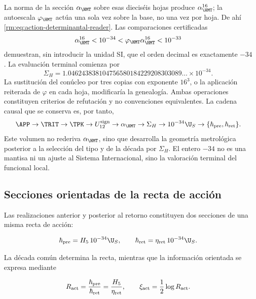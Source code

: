 La norma de la secci\'on \(\alpha_{\HMT}\) sobre esas diecis\'eis hojas
produce \(\alpha_{\HMT}^{16}\); la autoescala \(\varphi_{\HMT}\) act\'ua
una sola vez sobre la base, no una vez por hoja. De ah\'i
\cref{rm:eq:action-determinantal-reader}. Las comparaciones certificadas
\begin{equation}
\alpha_{\HMT}^{16}<10^{-34}
<\varphi_{\HMT}\alpha_{\HMT}^{16}<10^{-33}
\label{rm:eq:action-decade-bounds}
\end{equation}
demuestran, sin introducir la unidad SI, que el orden decimal es
exactamente \(-34\). La evaluaci\'on terminal comienza por
\begin{equation}
\Sigma_H
=1.046243838104756580184229208303089\ldots\times10^{-34}.
\label{rm:eq:action-sigma-value}
\end{equation}
La sustituci\'on del con\'ucleo por tres copias con exponente \(16^3\), o la
aplicaci\'on reiterada de \(\varphi\) en cada hoja, modificar\'ia la
genealog\'ia. Ambas operaciones constituyen criterios de refutaci\'on y no
convenciones equivalentes.
La cadena causal que se conserva es, por tanto,
\[
\APP\to\TRIT\to\TPK\to U_{12}^{\rm sign}
\to\alpha_{\HMT}\to\Sigma_H
\to10^{-34}\U_S\to
\{\hbar_{\rm pre},\hbar_{\rm ret}\}.
\]
Este volumen no rederiva \(\alpha_{\HMT}\), sino que desarrolla la geometr\'ia
metrol\'ogica posterior a la selecci\'on del tipo y de la d\'ecada por
\(\Sigma_H\). El entero \(-34\) no es una mantisa ni un ajuste al Sistema
Internacional, sino la valoraci\'on terminal del funcional local.

\subsection{Secciones orientadas de la recta de acci\'on}

Las realizaciones anterior y posterior al retorno constituyen dos secciones
de una misma recta de acci\'on:

\begin{equation}
\hbar_{\rm pre}=H_5\,10^{-34}\U_S,\qquad
\hbar_{\rm ret}=\eta_{\rm ret}\,10^{-34}\U_S.
\label{rm:eq:action-twoway}
\end{equation}

La d\'ecada com\'un determina la recta, mientras que la informaci\'on
orientada se expresa mediante

\begin{equation}
R_{\rm act}=\frac{\hbar_{\rm pre}}{\hbar_{\rm ret}}
=\frac{H_5}{\eta_{\rm ret}},
\qquad
\xi_{\rm act}=\frac12\log R_{\rm act}.
\label{rm:eq:action-rapidity}
\end{equation}

